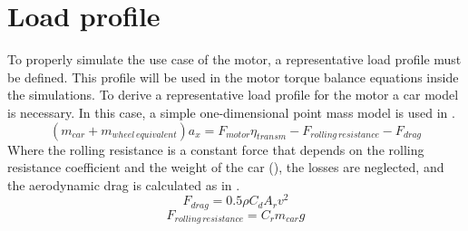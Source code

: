 \section{Load profile}
\label{section:03load_profile}
\vfill

To properly simulate the use case of the motor, a representative load profile must be defined. This profile will be used in the motor torque balance equations inside the simulations. To derive a representative load profile for the motor a car model is necessary. In this case, a simple one-dimensional point mass model is used in .
\begin{equation}
	\left(m_{car}+m_{wheel\,equivalent}\right)a_x = F_{motor}\eta_{transm}-F_{rolling\,resistance}-F_{drag}
	\label{eq:load_prof_initial}
\end{equation}
Where the rolling resistance is a constant force that depends on the rolling resistance coefficient and the weight of the car (), the losses are neglected, and the aerodynamic drag is calculated as in .
\begin{equation}
	F_{drag} = 0.5\rho C_{d} A_{r} v^2
	\label{eq:drag_force}
\end{equation}
\begin{equation}
	F_{rolling\,resistance} = C_{r} m_{car} g
	\label{eq:rolling_resistance}
\end{equation}

